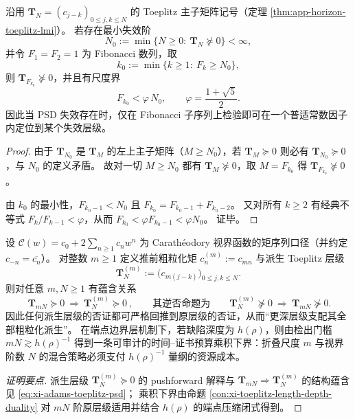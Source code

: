 \begin{proposition}\label{prop:xi-toeplitz-psd-fibonacci-localization}
沿用 \(\mathbf{T}_N=(c_{j-k})_{0\le j,k\le N}\) 的 Toeplitz 主子矩阵记号（定理 \ref{thm:app-horizon-toeplitz-lmi}）。
若存在最小失效阶
\[
N_0:=\min\{N\ge 0:\ \mathbf{T}_N\nsucceq 0\}<\infty,
\]
并令 \(F_1=F_2=1\) 为 Fibonacci 数列，取
\[
k_0:=\min\{k\ge 1:\ F_k\ge N_0\},
\]
则 \(\mathbf{T}_{F_{k_0}}\nsucceq 0\)，并且有尺度界
\[
\boxed{\;F_{k_0}<\varphi\,N_0,\qquad \varphi=\frac{1+\sqrt5}{2}.\;}
\]
因此当 PSD 失效存在时，仅在 Fibonacci 子序列上检验即可在一个普适常数因子内定位到某个失效层级。
\end{proposition}
\begin{proof}
由于 \(\mathbf{T}_{N_0}\) 是 \(\mathbf{T}_M\) 的左上主子矩阵（\(M\ge N_0\)），若 \(\mathbf{T}_M\succeq 0\) 则必有 \(\mathbf{T}_{N_0}\succeq 0\)，与 \(N_0\) 的定义矛盾。
故对一切 \(M\ge N_0\) 都有 \(\mathbf{T}_M\nsucceq 0\)，取 \(M=F_{k_0}\) 得 \(\mathbf{T}_{F_{k_0}}\nsucceq 0\)。
\par
由 \(k_0\) 的最小性，\(F_{k_0-1}<N_0\) 且 \(F_{k_0}=F_{k_0-1}+F_{k_0-2}\)。
又对所有 \(k\ge 2\) 有经典不等式 \(F_k/F_{k-1}<\varphi\)，从而
\(
F_{k_0}<\varphi F_{k_0-1}<\varphi N_0
\)。
证毕。
\end{proof}

\begin{conclusion}\label{con:xi-adams-coarsening-backprop-budget-product}
设 \(\mathscr{C}(w)=c_0+2\sum_{n\ge 1}c_n w^n\) 为 Carath\'eodory 视界函数的矩序列口径（并约定 \(c_{-n}=\overline{c_n}\)）。
对整数 \(m\ge 1\) 定义推前粗粒化矩
\(
c^{(m)}_n:=c_{mn}
\)
与派生 Toeplitz 层级
\[
\mathbf{T}^{(m)}_N:=\bigl(c_{m(j-k)}\bigr)_{0\le j,k\le N}.
\]
则对任意 \(m,N\ge 1\) 有蕴含关系
\[
\boxed{\ \mathbf{T}_{mN}\succeq 0\ \Longrightarrow\ \mathbf{T}^{(m)}_{N}\succeq 0\ },
\qquad\text{其逆否命题为}\qquad
\mathbf{T}^{(m)}_{N}\nsucceq 0\ \Longrightarrow\ \mathbf{T}_{mN}\nsucceq 0.
\]
因此任何派生层级的否证都可严格回推到原层级的否证，从而“更深层级支配其全部粗粒化派生”。
在端点边界层机制下，若缺陷深度为 \(h(\rho)\)，则由检出门槛 \(mN\gtrsim h(\rho)^{-1}\) 得到一条可审计的时间--证书预算乘积下界：折叠尺度 \(m\) 与视界阶数 \(N\) 的混合策略必须支付 \(h(\rho)^{-1}\) 量纲的资源成本。
\end{conclusion}
\begin{proof}[证明要点]
派生层级 \(\mathbf{T}^{(m)}_N\succeq 0\) 的 pushforward 解释与 \(\mathbf{T}_{mN}\Rightarrow \mathbf{T}^{(m)}_{N}\) 的结构蕴含见 \eqref{eq:xi-adams-toeplitz-psd}；
乘积下界由命题 \ref{con:xi-toeplitz-length-depth-duality} 对 \(mN\) 阶原层级适用并结合 \(h(\rho)\) 的端点压缩闭式得到。
\end{proof}

